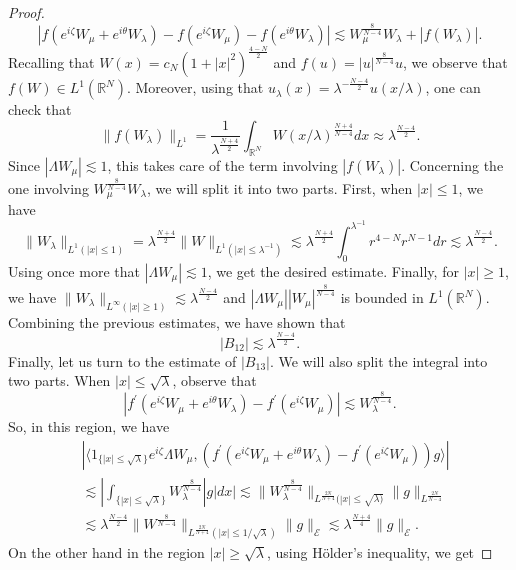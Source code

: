 \documentclass[a4paper,two-side,10pt]{amsart}
\newcommand{\R}{\mathbb{R}}
\numberwithin{equation}{section}
\begin{document}
\begin{proof}
$$|f(e^{i\zeta} W_\mu +e^{i\theta} W_\lambda ) - f(e^{i\zeta} W_\mu ) -f(e^{i\theta} W_\lambda)  |\lesssim W_\mu^{\frac{8}{N-4}} W_\lambda +|f(W_\lambda)| . $$
Recalling that $W(x)=c_N (1+|x|^2)^{\frac{4-N}{2}}$ and $f(u)= |u|^{\frac{8}{N-4}}u$, we observe that $f(W)\in L^1 (\R^N)$. Moreover, using that $u_\lambda (x)= \lambda^{- \frac{N-4}{2}}u(x/\lambda)$, one can check that 
$$\|f(W_\lambda)\|_{L^1}= \dfrac{1}{\lambda^{\frac{N+4}{2}}} \int_{\R^N} W (x/\lambda)^{\frac{N+4}{N-4}} dx\approx \lambda^{\frac{N-4}{2}}.$$ 
Since $|\Lambda W_\mu|\lesssim 1$, this takes care of the term involving $|f(W_\lambda)|$. Concerning the one involving $W_\mu^{\frac{8}{N-4}} W_\lambda$, we will split it into two parts. First, when $|x|\leq 1$, we have
$$\|W_\lambda\|_{L^1 (|x|\leq 1)} = \lambda^{\frac{N+4}{2}} \|W\|_{L^1 (|x|\leq \lambda^{-1})} \lesssim \lambda^{\frac{N+4}{2}} \int_0^{\lambda^{-1}} r^{4-N} r^{N-1} dr \lesssim \lambda^{\frac{N-4}{2}}.$$
Using once more that $|\Lambda W_\mu|\lesssim 1$, we get the desired estimate. Finally, for $|x|\geq 1$, we have $\|W_\lambda\|_{L^\infty (|x|\geq 1)} \lesssim \lambda^{\frac{N-4}{2}}$ and $| \Lambda W_\mu|  |W_\mu|^{\frac{8}{N-4}}$ is bounded in $L^1 (\R^N)$. Combining the previous estimates, we have shown that
$$|B_{12}|\lesssim \lambda^{\frac{N-4}{2}}.$$
Finally, let us turn to the estimate of $|B_{13}|$. We will also split the integral into two parts. When $|x|\leq \sqrt{\lambda}$, observe that
$$|f^\prime (e^{i\zeta} W_\mu +e^{i\theta} W_\lambda ) - f^\prime (e^{i\zeta} W_\mu )|\lesssim W_\lambda^{\frac{8}{N-4}}.$$
So, in this region, we have
\begin{align*}
& |\langle 1_{\{|x|\leq \sqrt{\lambda}\}}   e^{i\zeta} \Lambda W_\mu ,  (f^\prime (e^{i\zeta} W_\mu +e^{i\theta} W_\lambda ) - f^\prime (e^{i\zeta} W_\mu ))g \rangle |\\
&\lesssim |\int_{\{|x|\leq \sqrt{\lambda}\}} W_\lambda^{\frac{8}{N-4}} |g|dx | \lesssim   \|W_\lambda^{\frac{8}{N-4}}\|_{L^{\frac{2N}{N+4}}(|x|\leq \sqrt{\lambda)}}  \|g\|_{L^{\frac{2N}{N-4}}}\\
&\lesssim \lambda^{\frac{N-4}{2}} \|W^{\frac{8}{N-4}}\|_{L^{\frac{2N}{N+4}} (|x|\leq 1/ \sqrt{\lambda})} \|g\|_{\mathcal{E}} \lesssim \lambda^{\frac{N+4}{4}}\|g\|_{\mathcal{E}} .
\end{align*}
On the other hand in the region $|x|\geq \sqrt{\lambda}$, using H\" older's inequality, we get

\end{proof}
\end{document}
